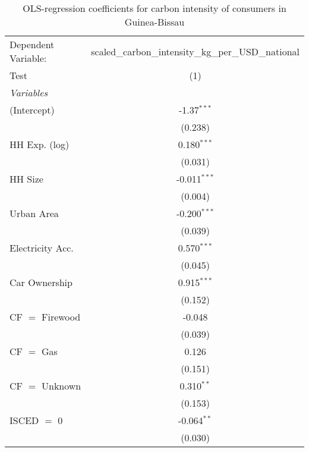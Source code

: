 
\begin{table}[htbp!]
   \centering
   \small
   \begin{adjustbox}{width = 1\textwidth, max height = 0.95\textheight, center}
      \begin{threeparttable}[b]
         \caption{\label{tab:OLS_1_GNB} OLS-regression coefficients for carbon intensity of consumers in Guinea-Bissau}
         \begin{tabular}{lc}
            \tabularnewline \midrule \midrule
            Dependent Variable: & scaled\_carbon\_intensity\_kg\_per\_USD\_national\\        
            Test                & (1)\\  
            \midrule
            \emph{Variables}\\
            (Intercept)         & -1.37$^{***}$\\   
                                & (0.238)\\   
            HH Exp. (log)       & 0.180$^{***}$\\   
                                & (0.031)\\   
            HH Size             & -0.011$^{***}$\\   
                                & (0.004)\\   
            Urban Area          & -0.200$^{***}$\\   
                                & (0.039)\\   
            Electricity Acc.    & 0.570$^{***}$\\   
                                & (0.045)\\   
            Car Ownership       & 0.915$^{***}$\\   
                                & (0.152)\\   
            CF $=$ Firewood     & -0.048\\   
                                & (0.039)\\   
            CF $=$ Gas          & 0.126\\   
                                & (0.151)\\   
            CF $=$ Unknown      & 0.310$^{**}$\\   
                                & (0.153)\\   
            ISCED $=$ 0         & -0.064$^{**}$\\   
                                & (0.030)\\   

\end{tabular}
\end{threeparttable}
\end{adjustbox}
\end{table}
